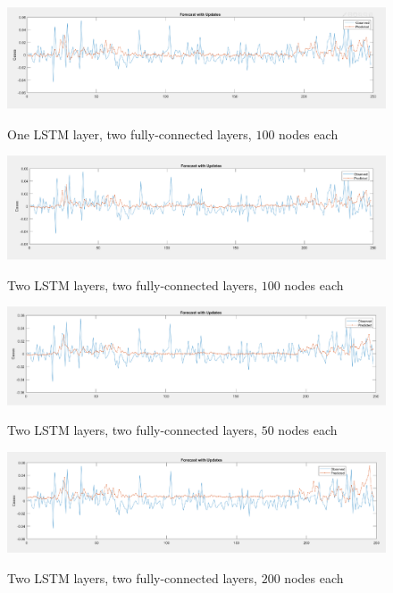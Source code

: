 \documentclass[12pt]{article}
\begin{document}
    \begin{figure}[H]
        \centering
        \caption{One LSTM layer, two fully-connected layers, $100$ nodes each}
        \includegraphics[scale=0.63]{../zezhong/lstm1.pdf}
        \label{fig:LSTM-zezhong-1}
    \end{figure}
    \begin{figure}[H]
        \centering
        \caption{Two LSTM layers, two fully-connected layers, $100$ nodes each}
        \includegraphics[scale=0.63]{../zezhong/lstm2.pdf}
        \label{fig:LSTM-zezhong-2}
    \end{figure}
    \begin{figure}[H]
        \centering
        \caption{Two LSTM layers, two fully-connected layers, $50$ nodes each}
        \includegraphics[scale=0.63]{../zezhong/lstm3.pdf}
        \label{fig:LSTM-zezhong-3}
    \end{figure}
    \begin{figure}[H]
        \centering
        \caption{Two LSTM layers, two fully-connected layers, $200$ nodes each}
        \includegraphics[scale=0.63]{../zezhong/lstm4.pdf}
        \label{fig:LSTM-zezhong-4}
    \end{figure}
\end{document}
